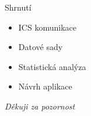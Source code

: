 \documentclass[hyperref={unicode}, xcolor={table}]{beamer}
\begin{document}
\begin{frame}[t]{Shrnutí}
    
        \begin{itemize}
            \item ICS komunikace
            \item Datové sady
            \item Statistická analýza
            \item Návrh aplikace
        \end{itemize}
    
        \vspace{2cm}
    
        \centering \Large
        \emph{Děkuji za pozornost}
    
\end{frame}

\end{document}
